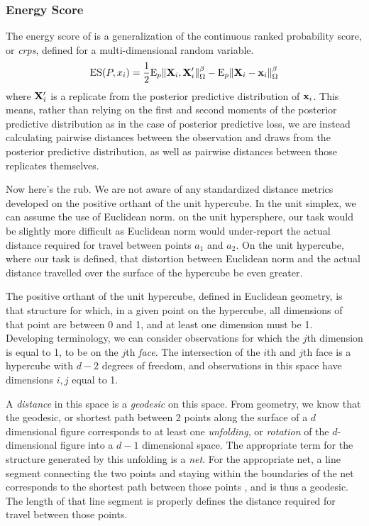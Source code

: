 \subsubsection{Energy Score}
The energy score of \cite{gneiting2007} is a generalization of the continuous ranked probability
  score, or \emph{crps}, defined for a multi-dimensional random variable.
  \begin{equation}
    \label{eq:es}
    \text{ES}(P,x_i) = \frac{1}{2}\text{E}_p\lVert {\bf X}_i,{\bf X}_i^{\prime}\rVert_{\Omega}^{\beta} -
                            \text{E}_p\lVert {\bf X}_i - {\bf x}_i\rVert_{\Omega}^{\beta}
  \end{equation}
  where ${\bf X}_i^{\prime}$ is a replicate from the posterior predictive distribution
  of ${\bf x}_i$. This means, rather than relying on the first and second moments of the posterior
  predictive distribution as in the case of posterior predictive loss\cite{gelfand1998}, we are
  instead calculating pairwise distances between the observation and draws from the posterior
  predictive distribution, as well as pairwise distances between those replicates themselves.

Now here's the rub.  We are not aware of any standardized distance metrics developed on the
  positive orthant of the unit hypercube.  In the unit simplex, we can assume the use of
  Euclidean norm.  on the unit hypersphere, our task would be slightly more difficult as
  Euclidean norm would under-report the actual distance required for travel between points $a_1$
  and $a_2$.  On the unit hypercube, where our task is defined, that distortion between Euclidean
  norm and the actual distance travelled over the surface of the hypercube be even greater.

The positive orthant of the unit hypercube, defined in Euclidean geometry, is that structure for
  which, in a given point on the hypercube, all dimensions of that point are between 0 and 1, and
  at least one dimension must be 1.  Developing terminology, we can consider observations for which
  the $j$th dimension is equal to 1, to be on the $j$th \emph{face}.  The intersection of the $i$th
  and $j$th face is a hypercube with $d-2$ degrees of freedom, and observations in this space have
  dimensions $i,j$ equal to 1.

A \emph{distance} in this space is a \emph{geodesic} on this space. From geometry, we know that
  the geodesic, or shortest path between 2 points along the surface of a $d$ dimensional figure
  corresponds to at least one \emph{unfolding}, or \emph{rotation} of the $d$-dimensional
  figure into a $d-1$ dimensional space.  The appropriate term for the structure generated by this
  unfolding is a \emph{net}.  For the appropriate net, a line segment connecting the two points and
  staying within the boundaries of the net corresponds to the shortest path between those points
  , and is thus a geodesic.  The length of that line segment is properly
  defines the distance required for travel between those points.

